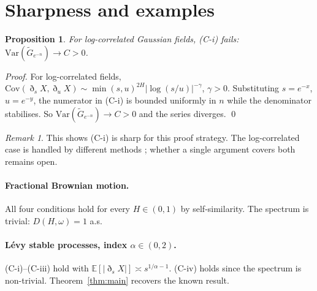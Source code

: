 \documentclass[11pt,a4paper]{article}
\newtheorem{proposition}[theorem]{Proposition}
\theoremstyle{definition}
\theoremstyle{remark}
\newtheorem{remark}[theorem]{Remark}
\newcommand{\E}{\mathbb{E}}
\begin{document}
\section{Sharpness and examples}\label{sec:sharp}

\begin{proposition}
For log-correlated Gaussian fields, (C-i) fails:
$\mathrm{Var}(\tilde G_{e^{-n}})\to C>0$.
\end{proposition}

\begin{proof}
For log-correlated fields,
$\mathrm{Cov}(\eth_s X,\eth_u X)\sim\min(s,u)^{2H}|\log(s/u)|^{-\gamma}$,
$\gamma>0$. Substituting $s=e^{-x}$, $u=e^{-y}$, the numerator
in (C-i) is bounded uniformly in $n$ while the denominator
stabilises. So $\mathrm{Var}(\tilde G_{e^{-n}})\to C>0$ and the
series diverges. \qed
\end{proof}

\begin{remark}
This shows (C-i) is sharp for this proof strategy. The log-correlated
case is handled by different methods \cite{bertacco2022}; whether a
single argument covers both remains open.
\end{remark}

\paragraph{Fractional Brownian motion.}
All four conditions hold for every $H\in(0,1)$ by self-similarity.
The spectrum is trivial: $D(H,\omega)=1$ a.s.

\paragraph{L\'{e}vy stable processes, index $\alpha\in(0,2)$.}
(C-i)--(C-iii) hold with $\E[|\eth_s X|]\asymp s^{1/\alpha-1}$.
(C-iv) holds since the spectrum is non-trivial. Theorem~\ref{thm:main}
recovers the known result.
\end{document}
